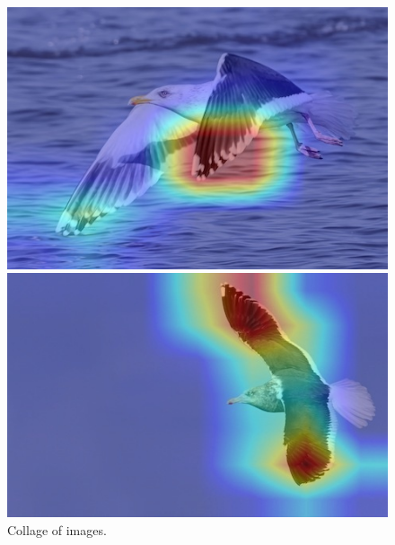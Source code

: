 \documentclass[a4paper,12pt]{report}
\begin{document}
\begin{figure}[htbp]
\begin{multicols}{6}
        \includegraphics[width=\linewidth]{images/interpretability/vgg/bird10.jpeg}
        
        \includegraphics[width=\linewidth]{images/interpretability/vgg/bird11.jpeg}
    \end{multicols}
    \caption{Collage of images.}
    \label{fig:collage}
\end{figure}
\end{document}
